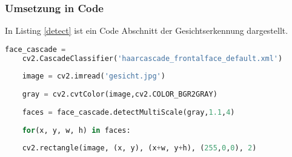 \subsubsection{Umsetzung in Code}

\begin{flushleft}
	
	In Listing \ref{detect} ist ein Code Abschnitt der Gesichtserkennung
	dargestellt. \\
	
	\begin{lstlisting}[language=Python, caption=Kern Code für
	Gesichtsdetektion,label=detect]
	face_cascade = 
	cv2.CascadeClassifier('haarcascade_frontalface_default.xml')
	
	image = cv2.imread('gesicht.jpg')
	
	gray = cv2.cvtColor(image,cv2.COLOR_BGR2GRAY)
	
	faces = face_cascade.detectMultiScale(gray,1.1,4)
	
	for(x, y, w, h) in faces:
	
	cv2.rectangle(image, (x, y), (x+w, y+h), (255,0,0), 2) 
	
	\end{lstlisting}
	

\end{flushleft}
